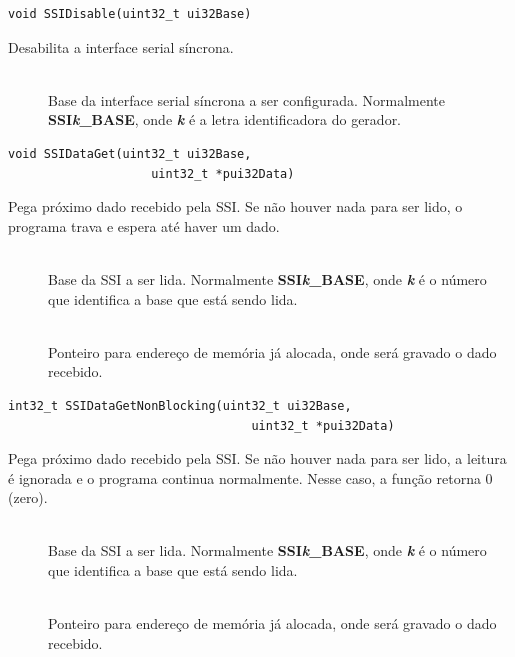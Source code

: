 \begin{lstlisting}[style=funcao]
	void SSIDisable(uint32_t ui32Base)
\end{lstlisting}

Desabilita a interface serial síncrona.

\begin{description}
	\item []\hfill \\
	Base da interface serial síncrona a ser configurada. Normalmente \textbf{SSI\emph{k}\_BASE}, onde \textbf{\emph{k}} é a letra identificadora do gerador.
\end{description}

\begin{lstlisting}[style=funcao]
	void SSIDataGet(uint32_t ui32Base,
					uint32_t *pui32Data)
\end{lstlisting}

Pega próximo dado recebido pela SSI. Se não houver nada para ser lido, o programa trava e espera até haver um dado.

\begin{description}
	\item []\hfill \\
	Base da SSI a ser lida. Normalmente \textbf{SSI\emph{k}\_BASE}, onde \textbf{\emph{k}} é o número que identifica a base que está sendo lida.
	
	\item []\hfill \\
	Ponteiro para endereço de memória já alocada, onde será gravado o dado recebido.
\end{description}

\begin{lstlisting}[style=funcao]
	int32_t SSIDataGetNonBlocking(uint32_t ui32Base,
								  uint32_t *pui32Data)
\end{lstlisting}

Pega próximo dado recebido pela SSI. Se não houver nada para ser lido, a leitura é ignorada e o programa continua normalmente. Nesse caso, a função retorna 0 (zero).

\begin{description}
	\item []\hfill \\
	Base da SSI a ser lida. Normalmente \textbf{SSI\emph{k}\_BASE}, onde \textbf{\emph{k}} é o número que identifica a base que está sendo lida.
	
	\item []\hfill \\
	Ponteiro para endereço de memória já alocada, onde será gravado o dado recebido.
\end{description}

